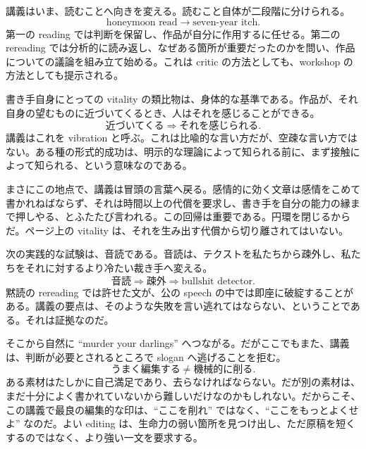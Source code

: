 講義はいま、読むことへ向きを変える。読むこと自体が二段階に分けられる。
\begin{equation}
\text{honeymoon read} \to \text{seven-year itch}.
\end{equation}
第一の reading では判断を保留し、作品が自分に作用するに任せる。第二の rereading では分析的に読み返し、なぜある箇所が重要だったのかを問い、作品についての議論を組み立て始める。これは critic の方法としても、workshop の方法としても提示される。

書き手自身にとっての vitality の類比物は、身体的な基準である。作品が、それ自身の望むものに近づいてくるとき、人はそれを感じることができる。
\begin{equation}
\text{近づいてくる} \Rightarrow \text{それを感じられる}.
\end{equation}
講義はこれを vibration と呼ぶ。これは比喩的な言い方だが、空疎な言い方ではない。ある種の形式的成功は、明示的な理論によって知られる前に、まず接触によって知られる、という意味なのである。

まさにこの地点で、講義は冒頭の言葉へ戻る。感情的に効く文章は感情をこめて書かれねばならず、それは時間以上の代償を要求し、書き手を自分の能力の縁まで押しやる、とふたたび言われる。この回帰は重要である。円環を閉じるからだ。ページ上の vitality は、それを生み出す代償から切り離されてはいない。

次の実践的な試験は、音読である。音読は、テクストを私たちから疎外し、私たちをそれに対するより冷たい裁き手へ変える。
\begin{equation}
\text{音読} \Rightarrow \text{疎外} \Rightarrow \text{bullshit detector}.
\end{equation}
黙読の rereading では許せた文が、公の speech の中では即座に破綻することがある。講義の要点は、そのような失敗を言い逃れてはならない、ということである。それは証拠なのだ。

そこから自然に ``murder your darlings'' へつながる。だがここでもまた、講義は、判断が必要とされるところで slogan へ逃げることを拒む。
\begin{equation}
\text{うまく編集する} \neq \text{機械的に削る}.
\end{equation}
ある素材はたしかに自己満足であり、去らなければならない。だが別の素材は、まだ十分によく書かれていないから難しいだけなのかもしれない。だからこそ、この講義で最良の編集的な印は、``ここを削れ'' ではなく、``ここをもっとよくせよ'' なのだ。よい editing は、生命力の弱い箇所を見つけ出し、ただ原稿を短くするのではなく、より強い一文を要求する。

